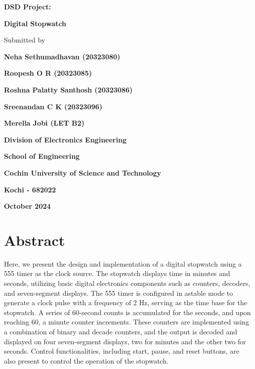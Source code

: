\documentclass[12pt, a4paper]{article}
\newcommand{\usection}[1]{
	\section*{\LARGE #1}
	\addcontentsline{toc}{section}{\protect\numberline{}#1}
}
\begin{document}
\begin{titlepage}
	\centering

	{\Large \textbf{DSD Project:} \par}
	\vspace{.3cm}
	{\huge \textbf{Digital Stopwatch} \par}

	\vspace{1.5cm}

	{\large Submitted by \par}

	\vspace{.5cm}

	{\large \textbf{Neha Sethumadhavan (20323080)}\par}
	{\large \textbf{Roopesh O R (20323085)}\par}
	{\large \textbf{Roshna Palatty Santhosh (20323086)}\par}
	{\large \textbf{Sreenandan C K (20323096)}\par}
	{\large \textbf{Merella Jobi (LET B2)}\par}

	\vspace{2cm}

 	\par

	\vspace{.1cm}

	{\textbf{Division of Electronics Engineering} \par}
	{\textbf{School of Engineering} \par}
	{\textbf{Cochin University of Science and Technology} \par}
	{\textbf{Kochi - 682022} \par}

	\vspace{.5cm}

	{\textbf{October 2024} \par}

	\vfill

\end{titlepage}
\setlength{\parskip}{5pt}%
\thispagestyle{empty}
\addtocounter{page}{-1}
\usection{Abstract}
\vspace{.5cm}
Here, we present the design and implementation of a digital stopwatch using a 555 timer as the clock source. The stopwatch displays time in minutes and seconds, utilizing basic digital electronics components such as counters, decoders, and seven-segment displays. The 555 timer is configured in astable mode to generate a clock pulse with a frequency of 2 Hz, serving as the time base for the stopwatch. A series of 60-second counts is accumulated for the seconds, and upon reaching 60, a minute counter increments. These counters are implemented using a combination of binary and decade counters, and the output is decoded and displayed on four seven-segment displays, two for minutes and the other two for seconds.
Control functionalities, including start, pause, and reset buttons, are also present to control the operation of the stopwatch.
\end{document}

